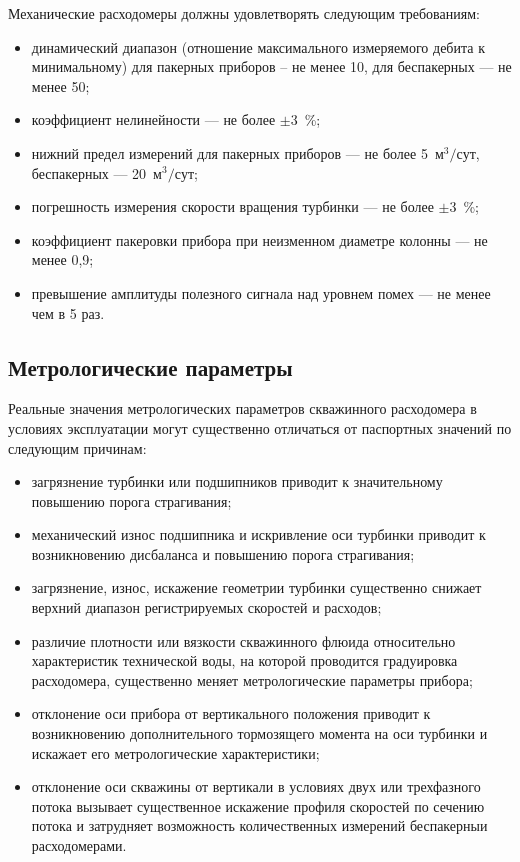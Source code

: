 Механические расходомеры должны удовлетворять следующим требованиям:
\begin{itemize}
    \item динамический диапазон (отношение максимального измеряемого дебита к минимальному) для пакерных приборов -- не менее 10, для беспакерных --- не менее 50;
    \item коэффициент нелинейности --- не более $\mathrm{\pm}$3~\%;
    \item нижний предел измерений для пакерных приборов --- не более 5~$\mathrm{м^3 / сут}$, беспакерных --- 20~$\mathrm{м^3 / сут}$;
    \item погрешность измерения скорости вращения турбинки --- не более $\mathrm{\pm}$3~\%;
    \item коэффициент пакеровки прибора при неизменном диаметре колонны --- не менее 0,9;
    \item превышение амплитуды полезного сигнала над уровнем помех --- не менее чем в 5 раз.
\end{itemize}

\subsection{Метрологические параметры}

Реальные значения метрологических параметров скважинного
расходомера в условиях эксплуатации могут существенно отличаться
от паспортных значений по следующим причинам:
\begin{itemize}
    \item загрязнение турбинки или подшипников приводит к
          значительному повышению порога страгивания;

    \item механический износ подшипника и искривление оси турбинки
          приводит к возникновению дисбаланса и повышению порога страгивания;
    \item загрязнение, износ, искажение геометрии турбинки существенно
          снижает верхний диапазон регистрируемых скоростей и расходов;

    \item различие плотности или вязкости скважинного флюида
          относительно характеристик технической воды, на которой
          проводится градуировка расходомера, существенно меняет
          метрологические параметры прибора;

    \item отклонение оси прибора от вертикального положения приводит к
          возникновению дополнительного тормозящего момента на оси
          турбинки и искажает его метрологические характеристики;

    \item отклонение оси скважины от вертикали в условиях двух или
          трехфазного потока вызывает существенное искажение профиля
          скоростей по сечению потока и затрудняет возможность
          количественных измерений беспакерныи расходомерами.
\end{itemize}

